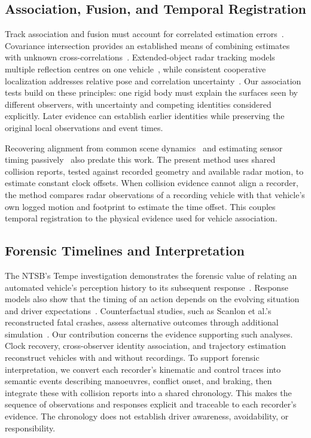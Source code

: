 \subsection{Association, Fusion, and Temporal Registration}

Track association and fusion must account for correlated estimation
errors~\cite{barshalom1981correlation,barshalom1986process}.
Covariance intersection provides an established means of combining estimates
with unknown cross-correlations~\cite{julier1997intersection}.
Extended-object radar tracking models multiple reflection centres on one
vehicle~\cite{hammarstrand2012extended}, while consistent cooperative
localization addresses relative pose and correlation
uncertainty~\cite{hery2021localization}.
Our association tests build on these principles: one rigid body must explain
the surfaces seen by different observers, with uncertainty and competing
identities considered explicitly. Later evidence can establish earlier
identities while preserving the original local observations and event times.

Recovering alignment from common scene dynamics~\cite{caspi2002alignment}
and estimating sensor timing passively~\cite{olson2010synchronization}
also predate this work. The present method uses shared collision reports,
tested against recorded geometry and available radar motion, to estimate
constant clock offsets. When collision evidence cannot align a recorder,
the method compares radar observations of a recording vehicle with that
vehicle's own logged motion and footprint to estimate the time offset.
This couples temporal registration to the physical evidence used for
vehicle association.

\subsection{Forensic Timelines and Interpretation}

The NTSB's Tempe investigation demonstrates the forensic value of relating
an automated vehicle's perception history to its subsequent
response~\cite{ntsb2019tempe}. Response models also show that the timing of
an action depends on the evolving situation and driver
expectations~\cite{engstrom2024response}. Counterfactual studies, such as
Scanlon et al.'s reconstructed fatal crashes, assess alternative outcomes
through additional simulation~\cite{scanlon2021fatal}.
Our contribution concerns the evidence supporting such analyses. Clock
recovery, cross-observer identity association, and trajectory estimation
reconstruct vehicles with and without recordings. To support forensic
interpretation, we convert each recorder's kinematic and control traces
into semantic events describing manoeuvres, conflict onset, and braking,
then integrate these with collision reports into a shared chronology.
This makes the sequence of observations and responses explicit and
traceable to each recorder's evidence. The chronology does not establish
driver awareness, avoidability, or responsibility.
